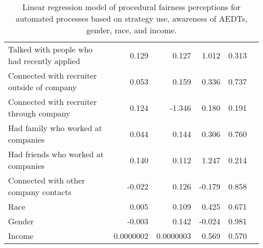 \begin{table}[ht]
\begin{tabular}{lrrrrl}
Talked with people who had recently applied       & 0.129  & 0.127 & 1.012  & 0.313           &   \\
Connected with recruiter outside of company       & 0.053  & 0.159 & 0.336  & 0.737           &   \\
Connected with recruiter through company          & 0.124  & -1.346    & 0.180 & 0.191            &   \\
Had family who worked at companies        & 0.044  & 0.144 & 0.306  & 0.760           &   \\
Had friends who worked at companies               & 0.140  & 0.112 & 1.247  & 0.214           &   \\
Connected with other company contacts             & -0.022 & 0.126 & -0.179 & 0.858           &   \\
Race                                              & 0.005  & 0.109 & 0.425  & 0.671           &   \\
Gender                                            & -0.003 & 0.142 & -0.024 & 0.981           &   \\
Income                                            & 0.0000002  & 0.0000003 & 0.569  & 0.570           &   \\ \hline
\end{tabular}
\caption{\label{tab:fairStats} Linear regression model of procedural fairness perceptions for automated processes based on strategy use, awareness of AEDTs, gender, race, and income.}
\end{table}

